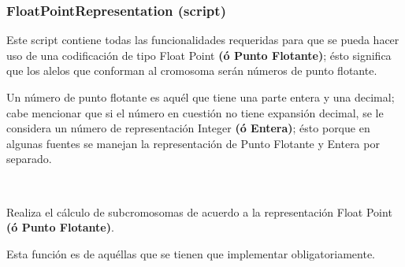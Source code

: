 \documentclass[letterpaper,10pt,english]{sphinxmanual}
\begin{document}
\subsubsection{FloatPointRepresentation (script)}
\label{Model/ChromosomalRepresentation/FloatPointRepresentation:floatpointrepresentation-script}\label{Model/ChromosomalRepresentation/FloatPointRepresentation::doc}
\begin{DUlineblock}{0em}
\item[] Este script contiene todas las funcionalidades requeridas para que se pueda hacer uso de una
codificación de tipo Float Point \textbf{(ó Punto Flotante)}; ésto significa que los alelos que
conforman al cromosoma serán números de punto flotante.
\item[] Un número de punto flotante es aquél que tiene una parte entera y una decimal; cabe mencionar que
si el número en cuestión no tiene expansión decimal, se le considera un número de representación Integer
\textbf{(ó Entera)}; ésto porque en algunas fuentes se manejan la representación de Punto Flotante y
Entera por separado.
\end{DUlineblock}
\label{Model/ChromosomalRepresentation/FloatPointRepresentation:module-Model.ChromosomalRepresentation.FloatPointRepresentation}

\begin{fulllineitems}
\label{Model/ChromosomalRepresentation/FloatPointRepresentation:Model.ChromosomalRepresentation.FloatPointRepresentation.calculate_length_subchromosomes}~
\begin{DUlineblock}{0em}
\item[] Realiza el cálculo de subcromosomas de acuerdo a la representación Float Point \textbf{(ó Punto Flotante)}.
\item[] Esta función es de aquéllas que se tienen que implementar obligatoriamente.
\end{DUlineblock}

\end{fulllineitems}

\end{document}

